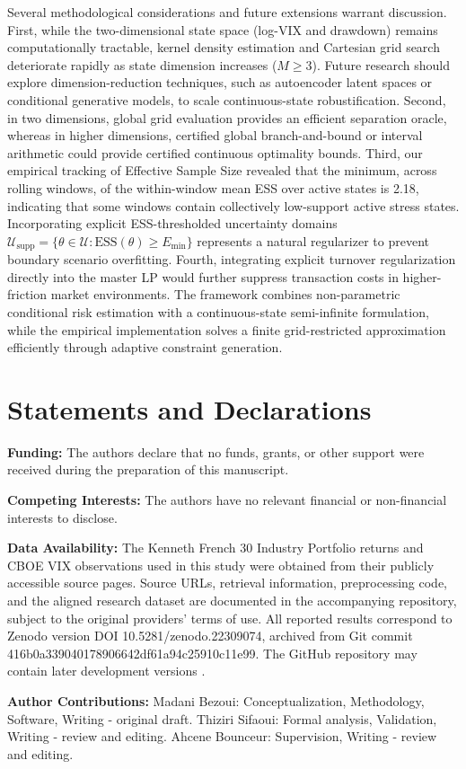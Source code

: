 \documentclass[smallextended]{svjour3}
\begin{document}
Several methodological considerations and future extensions warrant discussion. First, while the two-dimensional state space (log-VIX and drawdown) remains computationally tractable, kernel density estimation and Cartesian grid search deteriorate rapidly as state dimension increases ($M \ge 3$). Future research should explore dimension-reduction techniques, such as autoencoder latent spaces or conditional generative models, to scale continuous-state robustification. Second, in two dimensions, global grid evaluation provides an efficient separation oracle, whereas in higher dimensions, certified global branch-and-bound or interval arithmetic could provide certified continuous optimality bounds. Third, our empirical tracking of Effective Sample Size revealed that the minimum, across rolling windows, of the within-window mean ESS over active states is 2.18, indicating that some windows contain collectively low-support active stress states. Incorporating explicit ESS-thresholded uncertainty domains $\mathcal{U}_{\text{supp}} = \{\theta \in \mathcal{U} : \text{ESS}(\theta) \ge E_{\min}\}$ represents a natural regularizer to prevent boundary scenario overfitting. Fourth, integrating explicit turnover regularization directly into the master LP would further suppress transaction costs in higher-friction market environments. The framework combines non-parametric conditional risk estimation with a continuous-state semi-infinite formulation, while the empirical implementation solves a finite grid-restricted approximation efficiently through adaptive constraint generation.

\newpage




\section*{Statements and Declarations}

\textbf{Funding:} The authors declare that no funds, grants, or other support were received during the preparation of this manuscript.

\textbf{Competing Interests:} The authors have no relevant financial or non-financial interests to disclose.

\textbf{Data Availability:} The Kenneth French 30 Industry Portfolio returns \cite{french2026data} and CBOE VIX observations \cite{cboe2026vix} used in this study were obtained from their publicly accessible source pages. Source URLs, retrieval information, preprocessing code, and the aligned research dataset are documented in the accompanying repository, subject to the original providers' terms of use. All reported results correspond to Zenodo version DOI 10.5281/zenodo.22309074, archived from Git commit 416b0a339040178906642df61a94c25910c11e99. The GitHub repository may contain later development versions \cite{bezoui2026robust}.

\textbf{Author Contributions:} Madani Bezoui: Conceptualization, Methodology, Software, Writing - original draft. Thiziri Sifaoui: Formal analysis, Validation, Writing - review and editing. Ahcene Bounceur: Supervision, Writing - review and editing.


\end{document}
